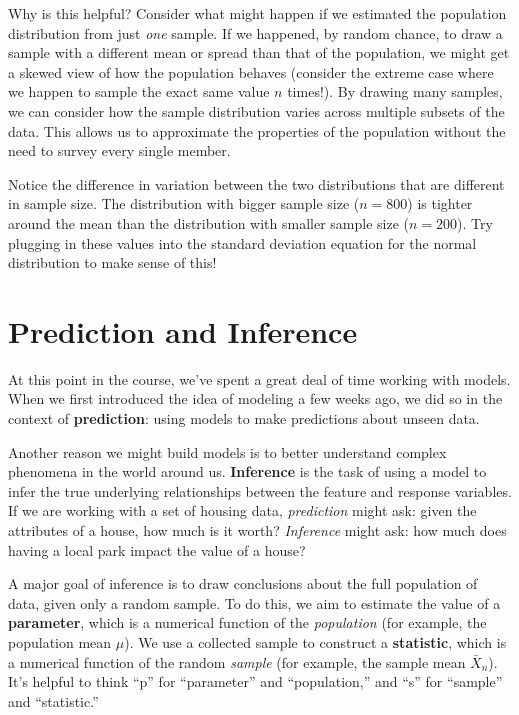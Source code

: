 \documentclass[
  letterpaper,
  DIV=11,
  numbers=noendperiod]{scrreprt}
\begin{document}
Why is this helpful? Consider what might happen if we estimated the
population distribution from just \emph{one} sample. If we happened, by
random chance, to draw a sample with a different mean or spread than
that of the population, we might get a skewed view of how the population
behaves (consider the extreme case where we happen to sample the exact
same value \(n\) times!). By drawing many samples, we can consider how
the sample distribution varies across multiple subsets of the data. This
allows us to approximate the properties of the population without the
need to survey every single member.

Notice the difference in variation between the two distributions that
are different in sample size. The distribution with bigger sample size
(\(n=800\)) is tighter around the mean than the distribution with
smaller sample size (\(n=200\)). Try plugging in these values into the
standard deviation equation for the normal distribution to make sense of
this!

\hypertarget{prediction-and-inference}{%
\section{Prediction and Inference}\label{prediction-and-inference}}

At this point in the course, we've spent a great deal of time working
with models. When we first introduced the idea of modeling a few weeks
ago, we did so in the context of \textbf{prediction}: using models to
make predictions about unseen data.

Another reason we might build models is to better understand complex
phenomena in the world around us. \textbf{Inference} is the task of
using a model to infer the true underlying relationships between the
feature and response variables. If we are working with a set of housing
data, \emph{prediction} might ask: given the attributes of a house, how
much is it worth? \emph{Inference} might ask: how much does having a
local park impact the value of a house?

A major goal of inference is to draw conclusions about the full
population of data, given only a random sample. To do this, we aim to
estimate the value of a \textbf{parameter}, which is a numerical
function of the \emph{population} (for example, the population mean
\(\mu\)). We use a collected sample to construct a \textbf{statistic},
which is a numerical function of the random \emph{sample} (for example,
the sample mean \(\bar{X}_n\)). It's helpful to think ``p'' for
``parameter'' and ``population,'' and ``s'' for ``sample'' and
``statistic.''
\end{document}
